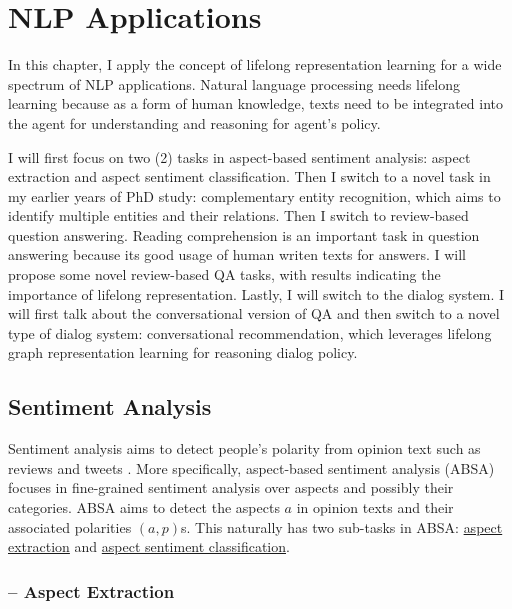 \chapter{NLP Applications}
\label{chap6:nlp}

In this chapter, I apply the concept of lifelong representation learning for a wide spectrum of NLP applications.
Natural language processing needs lifelong learning because as a form of human knowledge, texts need to be integrated into the agent for understanding and reasoning for agent's policy.

I will first focus on two (2) tasks in aspect-based sentiment analysis: aspect extraction and aspect sentiment classification.
Then I switch to a novel task in my earlier years of PhD study: complementary entity recognition, which aims to identify multiple entities and their relations.
Then I switch to review-based question answering. Reading comprehension is an important task in question answering because its good usage of human writen texts for answers. I will propose some novel review-based QA tasks, with results indicating the importance of lifelong representation.
Lastly, I will switch to the dialog system.
I will first talk about the conversational version of QA and then switch to a novel type of dialog system: conversational recommendation, which leverages lifelong graph representation learning for reasoning dialog policy.

\section{Sentiment Analysis}
\label{chap6:sec:sa}

Sentiment analysis aims to detect people's polarity from opinion text such as reviews and tweets \cite{Liu2012}.
More specifically, aspect-based sentiment analysis (ABSA) focuses in fine-grained sentiment analysis over aspects and possibly their categories.
ABSA aims to detect the aspects $a$ in opinion texts and their associated polarities $(a, p)$s.
This naturally has two sub-tasks in ABSA: \underline{aspect extraction} and \underline{aspect sentiment classification}.

\subsection{-- Aspect Extraction}


